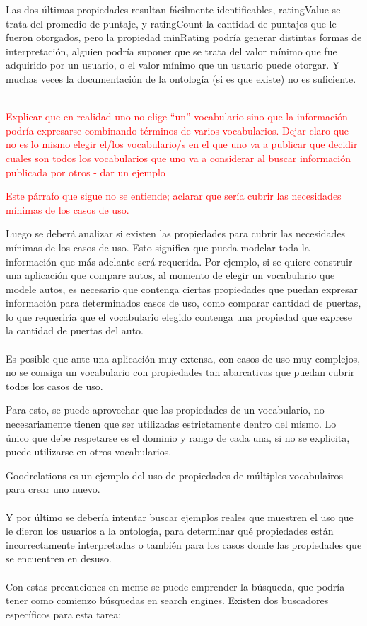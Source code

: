 \noindent Las dos últimas propiedades resultan fácilmente identificables, ratingValue se trata del promedio de puntaje, y ratingCount 
la cantidad de puntajes que le fueron otorgados, pero la propiedad minRating podría generar distintas formas de interpretación, 
alguien podría suponer que se trata del valor mínimo que fue adquirido por un usuario, o el valor mínimo que un usuario puede 
otorgar. Y muchas veces la documentación de la ontología (si es que existe) no es suficiente.
\\\\
\begin{framed}
\textcolor{red}{Explicar que en realidad uno no elige ``un'' vocabulario sino que la información podría expresarse combinando términos de varios vocabularios. Dejar claro que no es lo mismo elegir el/los vocabulario/s en el que uno va a publicar que decidir cuales son todos los vocabularios que uno va a considerar al buscar información publicada por otros - dar un ejemplo}
\end{framed}

\begin{framed}
\textcolor{red}{Este párrafo que sigue no se entiende; aclarar que sería cubrir las necesidades mínimas de los casos de uso.}
\end{framed}

\noindent Luego se deberá analizar si existen las propiedades para cubrir las necesidades mínimas de los casos de uso. Esto significa que pueda modelar 
toda la información que más adelante será requerida. Por ejemplo, si se quiere construir una aplicación que compare autos, al momento 
de elegir un vocabulario que modele autos, es necesario que contenga ciertas propiedades que puedan expresar información  para determinados 
casos de uso, como comparar cantidad de puertas, lo que requeriría que el vocabulario elegido contenga una propiedad que exprese la cantidad 
de puertas del auto.
\\\\
Es posible que ante una aplicación muy extensa, con casos de uso muy complejos, no se consiga un vocabulario con propiedades tan abarcativas 
que puedan cubrir todos los casos de uso. 

Para esto, se puede aprovechar que las propiedades de un vocabulario, no necesariamente tienen que ser utilizadas estrictamente dentro del mismo.
Lo único que debe respetarse es el dominio y rango de cada una, si no se explicita, puede utilizarse en otros vocabularios.

Goodrelations es un ejemplo del uso de propiedades de múltiples vocabulairos para crear uno nuevo.
\\\\
Y por último se debería intentar buscar ejemplos reales que muestren el uso que le dieron los usuarios a la ontología, para 
determinar qué propiedades están incorrectamente interpretadas o también para los casos donde las propiedades que se encuentren 
en desuso.
\\\\
Con estas precauciones en mente se puede emprender la búsqueda, que podría tener como comienzo búsquedas en  search engines. 
Existen dos buscadores específicos para esta tarea:

